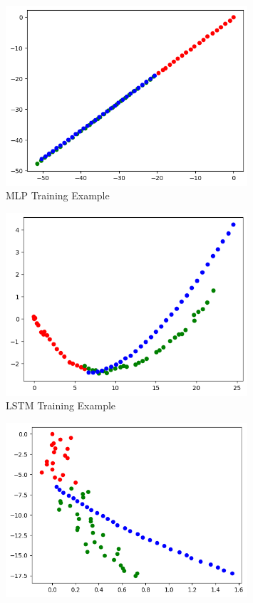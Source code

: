 \documentclass{article}
\begin{document}
\begin{itemize}
  \begin{figure}[h]
    \centering
    \includegraphics[width=0.8\textwidth]{mlp_1.png}
    \caption{MLP Training Example}
  \end{figure}
  \begin{figure}[h]
    \centering
    \includegraphics[width=0.8\textwidth]{lstm_1.png}
    \caption{LSTM Training Example}
  \end{figure}
  \begin{figure}[h]
    \centering
    \includegraphics[width=0.8\textwidth]{mlp_2.png}

\end{figure}
\end{itemize}
\end{document}
